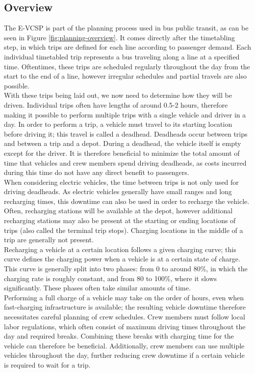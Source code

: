 \documentclass[]{article}
\begin{document}
\subsection{Overview}
The E-VCSP is part of the planning process used in bus public transit, as can be seen in Figure \ref{fig:planning-overview}. It comes directly after the timetabling step, in which trips are defined for each line according to passenger demand. Each individual timetabled trip represents a bus traveling along a line at a specified time. Oftentimes, these trips are scheduled regularly throughout the day from the start to the end of a line, however irregular schedules and partial travels are also possible. \\
With these trips being laid out, we now need to determine how they will be driven. Individual trips often have lengths of around 0.5-2 hours, therefore making it possible to perform multiple trips with a single vehicle and driver in a day. In order to perform a trip, a vehicle must travel to its starting location before driving it; this travel is called a deadhead. Deadheads occur between trips and between a trip and a depot. During a deadhead, the vehicle itself is empty except for the driver. It is therefore beneficial to minimize the total amount of time that vehicles and crew members spend driving deadheads, as costs incurred during this time do not have any direct benefit to passengers. \\
When considering electric vehicles, the time between trips is not only used for driving deadheads. As electric vehicles generally have small ranges and long recharging times, this downtime can also be used in order to recharge the vehicle. Often, recharging stations will be available at the depot, however additional recharging stations may also be present at the starting or ending locations of trips (also called the terminal trip stops). Charging locations in the middle of a trip are generally not present. \\
Recharging a vehicle at a certain location follows a given charging curve; this curve defines the charging power when a vehicle is at a certain state of charge. This curve is generally split into two phases: from 0 to around 80\%, in which the charging rate is roughly constant, and from 80 to 100\%, where it slows significantly. These phases often take similar amounts of time. \\
Performing a full charge of a vehicle may take on the order of hours, even when fast-charging infrastructure is available; the resulting vehicle downtime therefore necessitates careful planning of crew schedules. Crew members must follow local labor regulations, which often consist of maximum driving times throughout the day and required breaks. Combining these breaks with charging time for the vehicle can therefore be beneficial. Additionally, crew members can use multiple vehicles throughout the day, further reducing crew downtime if a certain vehicle is required to wait for a trip. \\
\end{document}
